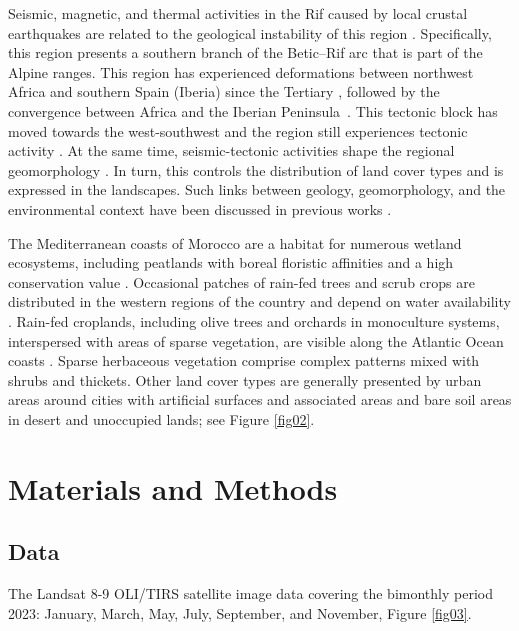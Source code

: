 \documentclass[geomatics,article,accept,pdftex,oneauthor]{Definitions/mdpi}
\begin{document}
Seismic, magnetic, and thermal activities in the Rif caused by local crustal earthquakes are related to the geological instability of this region \cite{DUARTE2024104330}. Specifically, this region presents a southern branch of the Betic--Rif arc that is part of the Alpine ranges. This region has experienced deformations between northwest Africa and southern Spain (Iberia) since the Tertiary \cite{CHABLI2014123}, followed by the convergence between Africa and the Iberian \mbox{Peninsula \cite{LGHAMOUR2024108941,KAIROUANI2024106762}}. This tectonic block has moved towards the west-southwest and the region still experiences tectonic activity \cite{MALUSA2024230533}. At the same time, seismic-tectonic activities shape the regional geomorphology \cite{SADKAOUI2024105219}. In turn, this controls the distribution of land cover types and is expressed in the landscapes. Such links between geology, geomorphology, and the environmental context have been discussed in previous works \cite{COSTA2024109578,BOUTAHAR2023104828,KAIROUANI2024106762}.

The Mediterranean coasts of Morocco are a habitat for numerous wetland ecosystems, including peatlands with boreal floristic affinities and a high conservation value \cite{MULLER202235,AJBILOU2006104}. Occasional patches of rain-fed trees and scrub crops are distributed in the western regions of the country and depend on water availability \cite{MARANON1999147}. Rain-fed croplands, including olive trees and orchards in monoculture systems, interspersed with areas of sparse vegetation, are visible along the Atlantic Ocean coasts \cite{SALMON2015321,ZAYANI2023e22910}. Sparse herbaceous vegetation comprise complex patterns mixed with shrubs and thickets. Other land cover types are generally presented by urban areas around cities with artificial surfaces and associated areas and bare soil areas in desert and unoccupied lands; see Figure \ref{fig02}. 

\section{Materials and Methods}

\subsection{Data}
The Landsat 8-9 OLI/TIRS satellite image data covering the bimonthly period 2023: January, March, May, July, September, and November, Figure \ref{fig03}. 
\end{document}
